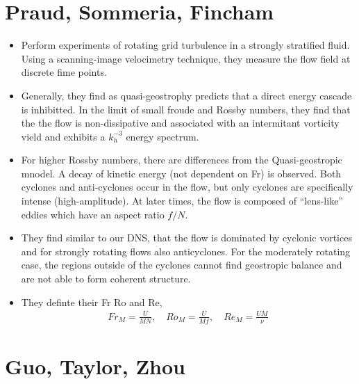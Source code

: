 \documentclass{article}
\begin{document}
\section{Praud, Sommeria, Fincham}
    \begin{itemize}
        \item Perform experiments of rotating grid turbulence in a strongly
        stratified fluid. Using a scanning-image velocimetry technique, they
        measure the flow field at discrete fime points. 
        \item Generally, they find as quasi-geostrophy
        predicts that a direct energy cascade is inhibitted. In the limit of
        small froude and Rossby numbers, they find that the the flow is
        non-dissipative and associated with an intermitant vorticity vield and
        exhibits a $k_h^{-3}$ energy spectrum. 
        \item For higher Rossby numbers, there are differences from the
        Quasi-geostropic mnodel. A decay of kinetic energy (not dependent on Fr)
        is observed. Both cyclones and anti-cyclones occur in the flow, but only
        cyclones are specifically intense (high-amplitude). At later times, the
        flow is composed of ``lens-like'' eddies which have an aspect ratio
        $f/N$. 
        \item They find similar to our DNS, that the flow is dominated by
        cyclonic vortices and for strongly rotating flows also anticyclones. For
        the moderately rotating case, the regions outside of the cyclones cannot
        find geostropic balance and are not able to form coherent structure. 
        \item They definte their Fr Ro and Re, 
        \begin{gather*}
            Fr_M = \frac{U}{MN}, \quad Ro_M = \frac{U}{Mf}, \quad Re_M =
            \frac{UM}{\nu}
        \end{gather*}
    \end{itemize}

\section{Guo, Taylor, Zhou}
\end{document}
